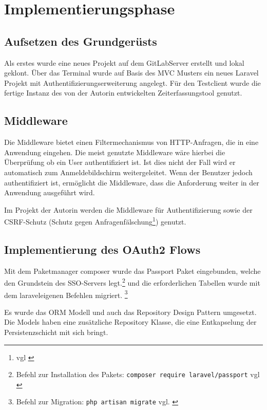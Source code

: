 \section{Implementierungsphase} 
\label{sec:Implementierungsphase}

\subsection{Aufsetzen des Grundgerüsts}
\label{sec:AufsetzenGrundgeruest}

Als erstes wurde eine neues Projekt auf dem GitLabServer erstellt und lokal geklont. Über das Terminal wurde auf Basis des MVC Musters ein neues Laravel Projekt mit Authentifizierungserweiterung angelegt. 
Für den Testclient wurde die fertige Instanz des von der Autorin entwickelten Zeiterfassungstool genutzt.

\subsection{Middleware}
\label{sec:Middleware}
Die Middleware bietet einen Filtermechanismus von HTTP-Anfragen, die in eine Anwendung eingehen. Die meist genutzte Middleware wäre hierbei die Überprüfung ob ein User authentifiziert ist. Ist dies nicht der Fall wird er automatisch zum Anmeldebildschirm weitergeleitet. Wenn der Benutzer jedoch authentifiziert ist, ermöglicht die Middleware, dass die Anforderung weiter in der Anwendung ausgeführt wird.

Im Projekt der Autorin werden die Middleware für Authentifizierung sowie der \acs{CSRF}-Schutz (Schutz gegen Anfragenfälschung\footnote{vgl \cite{CSRF}}) genutzt.

\subsection{Implementierung des OAuth2 Flows}
\label{sec:ImplementierungOAuth2}

Mit dem Paketmanager composer wurde das Passport Paket eingebunden, welche den Grundstein des SSO-Servers legt.\footnote{Befehl zur Installation des Pakets: \texttt{composer require laravel/passport} vgl \cite{composer}} und die erforderlichen Tabellen wurde mit dem laraveleigenen Befehlen migriert. \footnote{Befehl zur Migration: \texttt{php artisan migrate} vgl. \cite{Laravel}}

Es wurde das ORM Modell und auch das Repository Design Pattern umgesetzt. Die Models haben eine zusätzliche  Repository Klasse, die eine Entkapselung der Persistenzschicht mit sich bringt.

